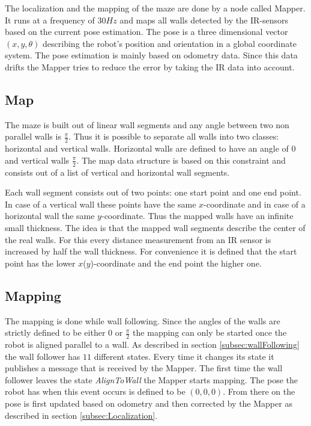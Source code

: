 The localization and the mapping of the maze are done by a node called Mapper.
It runs at a frequency of $30Hz$ and maps all walls detected by the IR-sensors based on the current pose estimation. The pose is a three dimensional vector $(x,y,\theta)$ describing the robot's position and orientation in a global coordinate system. The pose estimation is mainly based on odometry data. Since this data drifts the Mapper tries to reduce the error by taking the IR data into account.


\subsection{Map}
The maze is built out of linear wall segments and any angle between two non parallel walls is $\frac{\pi}{2}$.
Thus it is possible to separate all walls into two classes: horizontal and vertical walls. Horizontal walls are defined to have an angle of $0$ and vertical walls $\frac{\pi}{2}$. 
The map data structure is based on this constraint and consists out of a list of vertical and horizontal wall segments.

Each wall segment consists out of two points: one start point and one end point. In case of a vertical wall these points have the same $x$-coordinate and in case of a horizontal wall the same $y$-coordinate. Thus the mapped walls have an infinite small thickness. The idea is that the mapped wall segments describe the center of the real walls. For this every distance measurement from an IR sensor is increased by half the wall thickness.  
For convenience it is defined that the start point has the lower $x$($y$)-coordinate and the end point the higher one.

\subsection{Mapping}
The mapping is done while wall following. Since the angles of the walls are strictly defined to be either $0$ or $\frac{\pi}{2}$ the mapping can only be started once the robot is aligned parallel to a wall. As described in section \ref{subsec:wallFollowing} the wall follower has $11$ different states. Every time it changes its state it publishes a message that is received by the Mapper. The first time the wall follower leaves the state \textit{AlignToWall} the Mapper starts mapping. The pose the robot has when this event occurs is defined to be $(0,0,0)$. From there on the pose is first updated based on odometry and then corrected by the Mapper as described in section \ref{subsec:Localization}.

